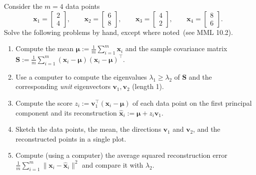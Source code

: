 \documentclass[letterpaper]{article}
\newcommand{\Real}{\mathbb{R}}
\newcommand{\tr}{^\top}
\begin{document}
Consider the $m = 4$ data points
\[
  \bm{x}_1 = \begin{bmatrix} 2 \\ 4 \end{bmatrix}, \qquad
  \bm{x}_2 = \begin{bmatrix} 6 \\ 8 \end{bmatrix}, \qquad
  \bm{x}_3 = \begin{bmatrix} 4 \\ 2 \end{bmatrix}, \qquad
  \bm{x}_4 = \begin{bmatrix} 8 \\ 6 \end{bmatrix}.
\]
Solve the following problems by hand, except where noted~(see MML 10.2).
\begin{enumerate}
\item Compute the mean $\bm{\mu} := \frac{1}{m} \sum_{i=1}^m \bm{x}_i$ and the sample covariance matrix $\bm{S} := \frac{1}{m} \sum_{i=1}^m (\bm{x}_i - \bm{\mu})(\bm{x}_i - \bm{\mu})\tr$.
\item Use a computer to compute the eigenvalues $\lambda_1 \ge \lambda_2$ of $\bm{S}$ and the corresponding \emph{unit} eigenvectors $\bm{v}_1, \bm{v}_2$ (length 1). 
\item Compute the score $z_i := \bm{v}_1\tr (\bm{x}_i - \bm{\mu})$ of each data point on the first principal component and its reconstruction $\hat{\bm{x}}_i := \bm{\mu} + z_i \bm{v}_1$.
\item Sketch the data points, the mean, the directions $\bm{v}_1$ and $\bm{v}_2$, and the reconstructed points in a single plot.
\item Compute (using a computer) the average squared reconstruction error $\frac{1}{m} \sum_{i=1}^m \| \bm{x}_i - \hat{\bm{x}}_i \|^2$ and compare it with $\lambda_2$. 
\end{enumerate}
\end{document}
